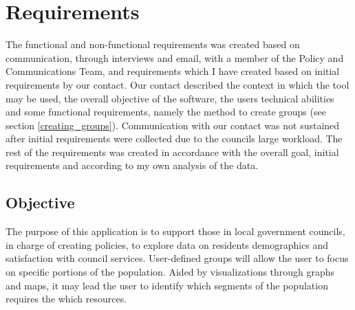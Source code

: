 \chapter{Requirements}

The functional and non-functional requirements was created based on communication, through interviews and email, with a member of the Policy and Communications Team, and requirements which I have created based on initial requirements by our contact. Our contact described the context in which the tool may be used, the overall objective of the software, the users\textsc{} technical abilities and some functional requirements, namely the method to create groups (see section \ref{creating_groups}). Communication with our contact was not sustained after initial requirements were collected due to the council\textquotesingle s large workload. The rest of the requirements was created in accordance with the overall goal, initial requirements and according to my own analysis of the data.

\section{Objective}
The purpose of this application is to support those in local government councils, in charge of creating policies, to explore data on residents demographics and satisfaction with council services. User-defined groups will allow the user to focus on specific portions of the population. Aided by visualizations through graphs and maps, it may lead the user to identify which segments of the population requires the which resources.

